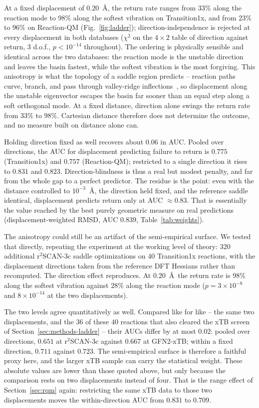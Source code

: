 \documentclass[11pt]{article}
\begin{document}
At a fixed displacement of $0.20$~\AA, the return rate ranges from $33\%$ along
the reaction mode to $98\%$ along the softest vibration on Transition1x, and from
$23\%$ to $96\%$ on Reaction-QM (Fig.~\ref{fig:ladder}); direction-independence
is rejected at every displacement in both databases ($\chi^2$ on the
$4\times2$ table of direction against return, $3$ d.o.f., $p<10^{-14}$
throughout).
The ordering is physically sensible and identical across the two databases: the
reaction mode is the unstable direction and leaves the basin fastest, while the
softest vibration is the most forgiving. This anisotropy is what the topology of a
saddle region predicts -- reaction paths curve, branch, and pass through
valley-ridge inflections~\cite{Maeda2015}, so displacement along the unstable
eigenvector escapes the basin far sooner than an equal step along a soft
orthogonal mode. At a fixed distance, direction alone swings the return rate from
$33\%$ to $98\%$. Cartesian distance therefore does not determine the outcome, and
no measure built on distance alone can.

Holding direction fixed as well recovers about $0.06$ in AUC. Pooled over
directions, the AUC for displacement
predicting failure to return is $0.775$ (Transition1x) and $0.757$
(Reaction-QM); restricted to a single direction it rises to $0.831$ and $0.823$.
Direction-blindness is thus a real
but modest penalty, and far from the whole gap to a perfect predictor. The
residue is the point: even with the distance controlled to $10^{-3}$~\AA, the
direction held fixed, and the reference saddle identical, displacement predicts
return only at AUC $\approx 0.83$. That is essentially the value reached by the
best purely geometric measure on real predictions (displacement-weighted RMSD,
AUC $0.839$, Table~\ref{tab:weights}).

The anisotropy could still be an artifact of the semi-empirical surface. We
tested that directly, repeating the experiment at the working level of theory:
$320$ additional r$^2$SCAN-3c saddle optimizations on $40$ Transition1x
reactions, with the displacement directions taken from the reference DFT Hessians
rather than recomputed. The direction effect reproduces. At $0.20$~\AA\ the
return rate is $98\%$ along the softest vibration against $28\%$ along the
reaction mode ($p=3\times10^{-8}$ and $8\times10^{-14}$ at the two
displacements).

The two levels agree quantitatively as well. Compared like for like -- the same
two displacements, and the $36$ of these $40$ reactions that also cleared the
xTB screen of Section~\ref{sec:methods-ladder} -- their AUCs differ by at most
$0.02$: pooled over directions, $0.651$ at r$^2$SCAN-3c against $0.667$ at
GFN2-xTB; within a fixed direction, $0.711$ against $0.723$. The semi-empirical
surface is therefore a faithful proxy here, and the larger xTB sample can carry
the statistical weight. These absolute values are lower than those quoted above,
but only because the comparison rests on two displacements instead of four. That
is the range effect of Section~\ref{sec:rqm} again: restricting the same xTB data
to those two displacements moves the within-direction AUC from $0.831$ to
$0.709$.
\end{document}

